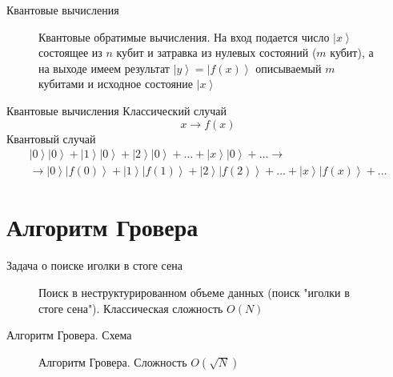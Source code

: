 \documentclass[10pt,pdf,hyperref={unicode}]{beamer}
\begin{document}
\begin{frame}{Квантовые вычисления}
\begin{figure}
\centering



\caption{Квантовые обратимые вычисления. На вход подается число
  $\left|x\right>$ состоящее из $n$ кубит и затравка из нулевых
  состояний ($m$ кубит), а на выходе имеем результат $\left|y\right> =
  \left|f\left(x\right)\right>$ описываемый $m$ кубитами и исходное
  состояние $\left|x\right>$} 
\label{figQuantCompQuantComp}
\end{figure}
\end{frame}


\begin{frame}{Квантовые вычисления}
Классический случай
\[
x \to f(x)
\]
Квантовый случай
\begin{eqnarray}
\left|0\right>\left|0\right> + \left|1\right>\left|0\right> + \left|2\right>\left|0\right> +
\dots + \left|x\right>\left|0\right> + \dots \to
\nonumber \\
\to 
\left|0\right>\left|f(0)\right> + \left|1\right>\left|f(1)\right> + \left|2\right>\left|f(2)\right> +
\dots + \left|x\right>\left|f(x)\right> + \dots
\nonumber
\end{eqnarray}
\end{frame}


\section{Алгоритм Гровера}
\begin{frame}{Задача о поиске иголки в стоге сена}
\begin{figure}
\centering



\caption{Поиск в неструктурированном объеме данных (поиск "иголки в
  стоге сена"). Классическая сложность $O(N)$}
\label{figQuantCompSearch}
\end{figure}
\end{frame}

\begin{frame}{Алгоритм Гровера. Схема}
\begin{figure}
\centering



\caption{Алгоритм Гровера. Сложность $ O(\sqrt{N})$}
\label{figQuantCompGrover}
\end{figure}
\end{frame}
\end{document}
